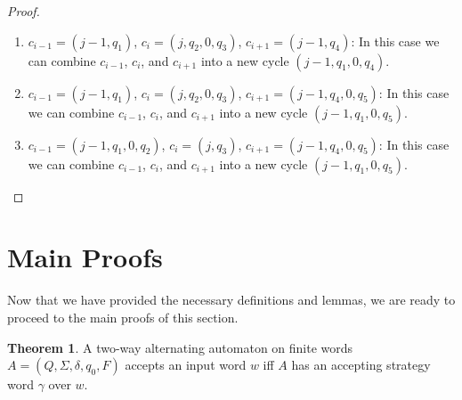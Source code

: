 \documentclass[10pt,a4paper]{amsart}
\theoremstyle{plain}
\theoremstyle{definition}
\newtheorem{theorem}[thm]{Theorem}
\theoremstyle{definition}
\DeclareMathOperator{\?}{?}
\begin{document}
\begin{proof}
\begin{enumerate}
\item
$c_{i-1}=(j-1,q_1)$, $c_i=(j,q_2,0,q_3)$, $c_{i+1}=(j-1,q_4)$:
In this case we can combine $c_{i-1}$, $c_i$, and $c_{i+1}$ into a new cycle $(j-1,q_1,0,q_4)$.

\item
$c_{i-1}=(j-1,q_1)$, $c_i=(j,q_2,0,q_3)$, $c_{i+1}=(j-1,q_4,0,q_5)$:
In this case we can combine $c_{i-1}$, $c_i$, and $c_{i+1}$ into a new cycle $(j-1,q_1,0,q_5)$.

\item
$c_{i-1}=(j-1,q_1,0,q_2)$, $c_i=(j,q_3)$, $c_{i+1}=(j-1,q_4,0,q_5)$:
In this case we can combine $c_{i-1}$, $c_i$, and $c_{i+1}$ into a new cycle $(j-1,q_1,0,q_5)$. \qedhere


 \end{enumerate}
\end{proof}


\section{Main Proofs}

Now that we have provided the necessary definitions and lemmas, we are ready to proceed to the main proofs of this section.

\begin{theorem}
    A two-way alternating automaton on finite words $A = (Q, \Sigma, \delta, q_0, F)$
    accepts an input word $w$ iff $A$ has an accepting strategy word $\gamma$ over $w$.
\end{theorem}
\end{document}
